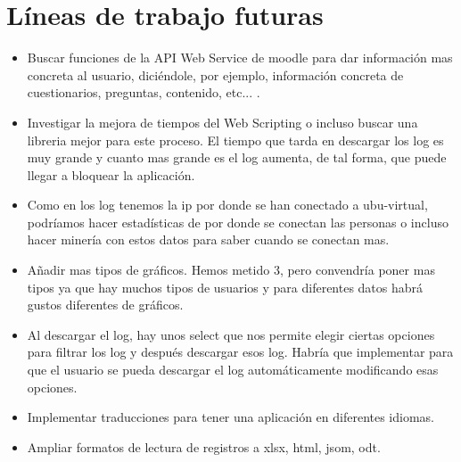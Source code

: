 \section{Líneas de trabajo futuras}\label{luxedneas-de-trabajo-futuras}

\begin{itemize}
	\tightlist
	\item
	Buscar funciones de la API Web Service de moodle para dar información mas concreta al usuario, diciéndole, por ejemplo, información concreta de cuestionarios, preguntas, contenido, etc... .
	\item
	Investigar la mejora de tiempos del Web Scripting o incluso buscar una libreria mejor para este proceso. El tiempo que tarda en descargar los log es muy grande y cuanto mas grande es el log aumenta, de tal forma, que puede llegar a bloquear la aplicación.
	\item
	Como en los log tenemos la ip por donde se han conectado a ubu-virtual, podríamos hacer estadísticas de por donde se conectan las personas o incluso hacer minería con estos datos para saber cuando se conectan mas.
	\item
	Añadir mas tipos de gráficos. Hemos metido 3, pero convendría poner mas tipos ya que hay muchos tipos de usuarios y para diferentes datos habrá gustos diferentes de gráficos.
	\item
	Al descargar el log, hay unos select que nos permite elegir ciertas opciones para filtrar los log y después descargar esos log. Habría que implementar para que el usuario se pueda descargar el log automáticamente modificando esas opciones.
	\item
	Implementar traducciones para tener una aplicación en diferentes idiomas.
	\item
	Ampliar formatos de lectura de registros a xlsx, html, jsom, odt.
	
\end{itemize}
